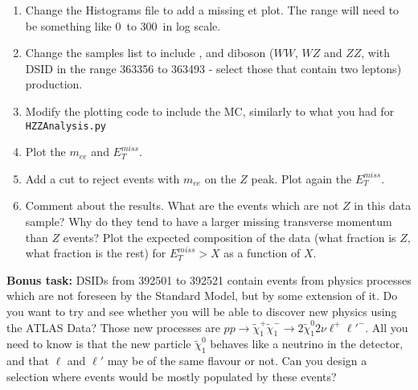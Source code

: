 \begin{enumerate} 
\item Change the Histograms file to add a missing et plot. The range will need to be something like 0\ \GeV to 300\ \GeV in log scale. 
\item Change the samples list to include \ttbar, and diboson ($WW$, $WZ$ and $ZZ$, with DSID in the range 363356 to 363493 - select those that contain two leptons) production.   
\item Modify the plotting code to include the MC, similarly to what you had for \verb|HZZAnalysis.py|
\item Plot the $m_{ee}$ and $E_{T}^{miss}$.
\item Add a cut to reject events with $m_{ee}$ on the $Z$ peak. Plot again the $E_{T}^{miss}$. 
\item Comment about the results. What are the events which are not $Z$ in this data sample? Why do they tend to have a larger missing transverse momentum than $Z$ events?  Plot the expected composition of the data (what fraction is $Z$, what fraction is the rest) for $ E_{T}^{miss} > X$ as a function of $X$.
\end{enumerate}

\begin{mybox}
\textbf{Bonus task:} DSIDs from 392501 to 392521 contain events from physics processes which are not foreseen by the Standard Model, but by some extension of it. Do you want to try and see whether you will be able to discover new physics using the ATLAS Data? Those new processes are $pp\rightarrow \tilde{\chi}^+_1  \tilde{\chi}^-_1 \rightarrow 2\tilde{\chi}^0_1 2\nu \ell^+\ell'^-$. All you need to know is that the new particle $\tilde{\chi}^0_1$ behaves like a neutrino in the detector, and that $\ell$ and $\ell'$ may be of the same flavour or not. Can you design a selection where events would be mostly populated by these events? 
\end{mybox}


